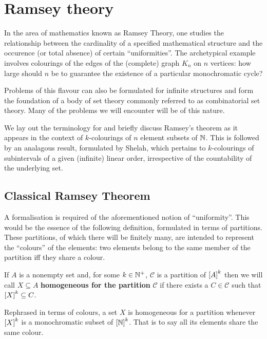 

\chapter{Ramsey theory}

In the area of mathematics known as Ramsey Theory, one studies the relationship
between the cardinality of a specified mathematical structure and the occurence
(or total absence) of certain ``uniformities''.  The archetypical example
involves colourings of the edges of the (complete) graph $K_n$ on $n$ vertices:
how large should $n$ be to guarantee the existence of a particular monochromatic
cycle?

Problems of this flavour can also be formulated for infinite structures and form
the foundation of a body of set theory commonly referred to as combinatorial
set theory.  Many of the problems we will encounter will be of this nature.

We lay out the terminology for and briefly discuss Ramsey's theorem as it
appears in the context of $k$-colourings of $n$ element subsets of $\nats$.
This is followed by an analagous result, formulated by Shelah, which pertains to
$k$-colourings of subintervals of a given (infinite) linear order, irrespective
of the countability of the underlying set.

\section{Classical Ramsey Theorem}

A formalisation is required of the aforementioned notion of ``uniformity''.
This would be the essence of the following definition, formulated in terms of
partitions.  These partitions, of which there will be finitely many, are
intended to represent the ``colours'' of the elements: two elements belong to
the same member of the partition iff they share a colour.

\begin{dfn}
	If $A$ is a nonempty set and, for some $k\in\posnats$, $\mathcal{C}$ is a
	partition of $\subsets{k}{A}$ then we will call $X\subseteq A$
	\textbf{homogeneous for the partition} $\mathcal{C}$ if there exists a $C\in
		\mathcal{C}$ such that $\subsets{k}{X}\subseteq C$.
\end{dfn}

Rephrased in terms of colours, a set $X$ is homogeneous for a partition whenever
$\subsets{k}{X}$ is a monochromatic subset of $\subsets{k}{\nats}$.  That is to
say all its elements share the same colour.

